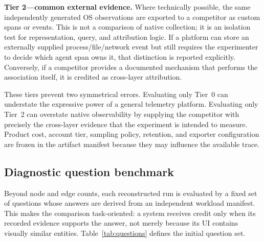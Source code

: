 \textbf{Tier 2---common external evidence.} Where technically possible, the same independently generated OS observations are exported to a competitor as custom spans or events. This is not a comparison of native collection; it is an isolation test for representation, query, and attribution logic. If a platform can store an externally supplied process/file/network event but still requires the experimenter to decide which agent span owns it, that distinction is reported explicitly. Conversely, if a competitor provides a documented mechanism that performs the association itself, it is credited as cross-layer attribution.

These tiers prevent two symmetrical errors. Evaluating only Tier~0 can understate the expressive power of a general telemetry platform. Evaluating only Tier~2 can overstate native observability by supplying the competitor with precisely the cross-layer evidence that the experiment is intended to measure. Product cost, account tier, sampling policy, retention, and exporter configuration are frozen in the artifact manifest because they may influence the available trace.

\subsection{Diagnostic question benchmark}
Beyond node and edge counts, each reconstructed run is evaluated by a fixed set of questions whose answers are derived from an independent workload manifest. This makes the comparison task-oriented: a system receives credit only when its recorded evidence supports the answer, not merely because its UI contains visually similar entities. Table~\ref{tab:questions} defines the initial question set.

